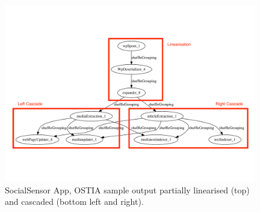 \documentclass[smallextended]{svjour3}       %
\begin{document}
\begin{figure}
\begin{center}
		\includegraphics[width=11cm,draft]{fig7}
		\caption{SocialSensor App, OSTIA sample output partially linearised (top) and cascaded (bottom left and right).}
		\label{topo1}
		\end{center}
\end{figure}





%
\end{document}
